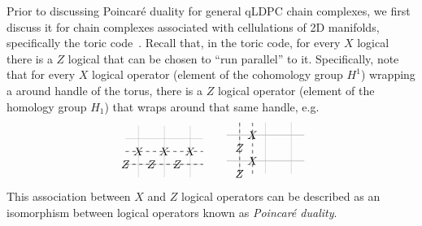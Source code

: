 \documentclass[aps,prx,reprint,superscriptaddress,nofootinbib]{revtex4-2}
\theoremstyle{definition}
\newcommand{\<}{\langle}
\renewcommand{\>}{\rangle}
\begin{document}
Prior to discussing Poincar\'e duality for general qLDPC chain complexes, we first discuss it for chain complexes associated with cellulations of 2D manifolds, specifically the toric code~\cite{Chen_2023, hatcher2002algebraic}.
Recall that, in the toric code, for every $X$ logical there is a $Z$ logical that can be chosen to ``run parallel'' to it.
%
Specifically, note that for every $X$ logical operator (element of the cohomology group $H^1$) wrapping a around handle of the torus, there is a $Z$ logical operator (element of the homology group $H_1$) that wraps around that same handle, e.g.
\begin{equation} \label{eq-logicalpairing}
    \begin{tikzpicture}[scale = 0.8, baseline = {([yshift=-.5ex]current bounding box.center)}]
        \foreach \i in {0, 1, 2}{
            \draw[color = lightgray] (\i, -0.5) -- (\i, 1.5);}
        \foreach \i in {0, 1}{
            \draw[color = lightgray] (-0.5, \i) -- (2.5, \i);}
        \draw[color = gray, line width = 1 pt, dashed] (-0.5, 0.5) -- (2.5, 0.5);
        \draw[color = gray, line width = 1 pt, dashed] (-0.5, 0.) -- (2.5, 0.);
        \foreach \i in {0, 1, 2}{
            \node at (\i, 0.5) {${X}$};
            \node at (\i - 0.5, 0) {${Z}$};
        }
    \end{tikzpicture}
    \qquad     \begin{tikzpicture}[scale = 0.8, baseline = {([yshift=-.5ex]current bounding box.center)}]
        \foreach \i in {0, 1, 2}{
            \draw[color = lightgray] (\i, -0.5) -- (\i, 1.5);
        }
        \foreach \i in {0, 1}{
            \draw[color = lightgray] (-0.5, \i) -- (2.5, \i); 
        }
        \draw[color = gray, line width = 1pt, dashed] (0, -0.5) --  (0, 1.5);
        \draw[color = gray, line width = 1pt, dashed] (0.5, -0.5) --  (0.5, 1.5);
        \foreach \i in {0, 1}{
            \draw[color = lightgray] (-0.5, \i) -- (2.5, \i);
            \node at (0.5, \i) {${X}$};
            \node at (0, \i - 0.5) {${Z}$};
        }
    \end{tikzpicture}
\end{equation}
%
This association between $X$ and $Z$ logical operators can be described as an isomorphism between logical operators known as \textit{Poincar\'e duality}.
\end{document}
